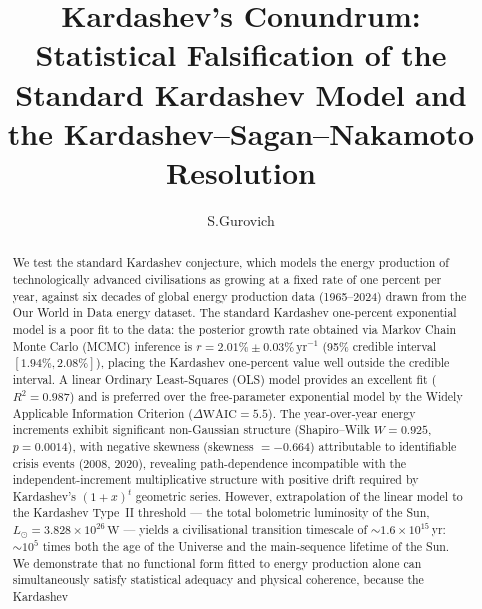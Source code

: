 \documentclass[final,5p,times,twocolumn,authoryear]{elsarticle}
\begin{document}
\begin{frontmatter}

\title{Kardashev's Conundrum: Statistical Falsification of the
Standard Kardashev Model and the Kardashev--Sagan--Nakamoto Resolution}
 
    \author[iate,wsu]{S.Gurovich}
  
\address[iate]{
   Instituto De Astronom\'ia Te\'orica y Experimental -
   Observatorio Astron\'omico C\'ordoba (IATE--OAC--UNC--CONICET),
   Laprida 854, X5000BGR, C\'ordoba, Argentina}
\address[wsu]{
   Western Sydney University, Kingswood campus, NSW, Australia (visiting fellow 2019, 2024)
}

\begin{abstract}
We test the standard Kardashev conjecture, which models the energy
production of technologically advanced civilisations as growing at a
fixed rate of one percent per year, against six decades of global
energy production data (1965--2024) drawn from the Our World in Data
energy dataset. The standard Kardashev one-percent exponential model
is a poor fit to the data: the posterior growth rate obtained via
Markov Chain Monte Carlo (MCMC) inference is
$r = 2.01\% \pm 0.03\%\,\mathrm{yr}^{-1}$ (95\% credible interval
$[1.94\%, 2.08\%]$), placing the Kardashev one-percent value well
outside the credible interval. A linear Ordinary Least-Squares (OLS)
model provides an excellent fit ($R^2 = 0.987$) and is preferred over
the free-parameter exponential model by the Widely Applicable
Information Criterion ($\Delta\mathrm{WAIC} = 5.5$). The
year-over-year energy increments exhibit significant non-Gaussian
structure (Shapiro--Wilk $W = 0.925$, $p = 0.0014$), with negative
skewness (skewness $= -0.664$) attributable to identifiable crisis events (2008, 2020),
revealing path-dependence incompatible with the independent-increment
multiplicative structure with positive drift required by Kardashev's
$(1+x)^t$ geometric series.
However, extrapolation of the linear model to the Kardashev Type~II
threshold --- the total bolometric luminosity of the Sun,
$L_\odot = 3.828 \times 10^{26}\,\mathrm{W}$ --- yields a
civilisational transition timescale of $\sim 1.6 \times
10^{15}$\,yr: $\sim 10^5$ times both the age of the Universe
and the main-sequence lifetime of the Sun.
 We demonstrate that no functional
form fitted to energy production alone can simultaneously satisfy
statistical adequacy and physical coherence, because the Kardashev

\end{abstract}
\end{frontmatter}
\end{document}
